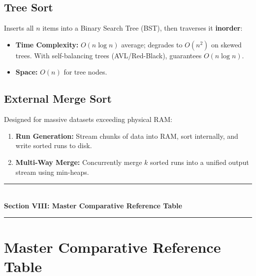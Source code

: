 \subsection{Tree Sort}
Inserts all $n$ items into a Binary Search Tree (BST), then traverses it \textbf{inorder}:
\begin{itemize}
    \item \textbf{Time Complexity:} $O(n \log n)$ average; degrades to $\boxed{O(n^2)}$ on skewed trees. With self-balancing trees (AVL/Red-Black), guarantees $O(n \log n)$.
    \item \textbf{Space:} $O(n)$ for tree nodes.
\end{itemize}

\subsection{External Merge Sort}
Designed for massive datasets exceeding physical RAM:
\begin{enumerate}
    \item \textbf{Run Generation:} Stream chunks of data into RAM, sort internally, and write sorted runs to disk.
    \item \textbf{Multi-Way Merge:} Concurrently merge $k$ sorted runs into a unified output stream using min-heaps.
\end{enumerate}

\newpage
\begin{center}
\vspace{0.5em}
{\color{primary}\rule{0.45\textwidth}{1.2pt}}\\[4pt]
{\Large\bfseries\color{primary} Section VIII: Master Comparative Reference Table}\\[2pt]
{\color{primary}\rule{0.45\textwidth}{1.2pt}}
\vspace{0.5em}
\end{center}

\section{Master Comparative Reference Table}

